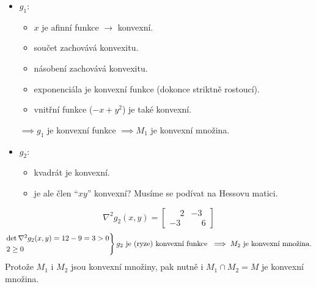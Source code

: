 \begin{itemize}
    \item $g_1$:
        \begin{itemize}
            \item $x$ je afinní funkce $\rightarrow$ konvexní.
            \item součet zachovává konvexitu.
            \item násobení zachovává konvexitu.
            \item exponenciála je konvexní funkce (dokonce striktně rostoucí).
            \item vnitřní funkce ($-x + y^2$) je také konvexní.
        \end{itemize} 
        $\implies g_1$ je konvexní funkce $\implies M_1$ je konvexní množina.
    \item $g_2$: 
        \begin{itemize}
            \item kvadrát je konvexní.
            \item je ale člen \enquote{$xy$} konvexní? Musíme se podívat na Hessovu matici.
        \end{itemize}
\end{itemize}
\[  
    \nabla^2 g_2(x, y) = 
    \begin{bmatrix}
        \phantom{-}2 & -3 \\
        -3 & \phantom{-}6
    \end{bmatrix}
\]
\[
    \begin{rcases*}
        \det \nabla^2 g_2(x, y) = 12 - 9 = 3 > 0 \\
        2 \geq 0
    \end{rcases*} g_2 \text{ je (ryze) konvexní funkce } \implies M_2 \text{ je konvexní množina.}
\]
Protože $M_1$ i $M_2$ jsou konvexní množiny, pak nutně i $M_1 \cap M_2 = M$ je konvexní množina.